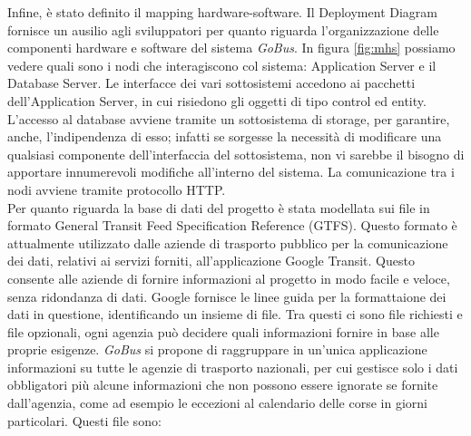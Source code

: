 Infine, \`{e} stato definito il mapping hardware-software. Il Deployment Diagram fornisce un ausilio agli sviluppatori per quanto riguarda l\rq organizzazione delle componenti hardware e software del sistema \emph{GoBus}. In figura \ref{fig:mhs} possiamo vedere quali sono i nodi che interagiscono col sistema: Application Server e il Database Server. Le interfacce dei vari sottosistemi accedono ai pacchetti dell\rq Application Server, in cui risiedono gli oggetti di tipo control ed entity. L\rq accesso al database avviene tramite un sottosistema di storage, per garantire, anche, l’indipendenza di esso; infatti se sorgesse la necessit\`{a} di modificare una qualsiasi componente dell’interfaccia del sottosistema, non vi sarebbe il bisogno di apportare innumerevoli modifiche all’interno del sistema. La comunicazione tra i nodi avviene tramite protocollo HTTP.\\
Per quanto riguarda la base di dati del progetto \`{e} stata modellata sui file in formato General Transit Feed Specification Reference (GTFS). Questo formato \`{e} attualmente utilizzato dalle aziende di trasporto pubblico per la comunicazione dei dati, 
relativi ai servizi forniti, all\rq applicazione Google Transit. Questo consente alle aziende di 
fornire informazioni al progetto in modo facile e veloce, senza ridondanza di dati. 
Google fornisce le linee guida per la formattaione dei dati in questione, identificando un 
insieme di file. Tra questi ci sono file richiesti e file opzionali, ogni agenzia può decidere 
quali informazioni fornire in base alle proprie esigenze. \emph{GoBus} si propone di raggruppare 
in un\rq unica applicazione informazioni su tutte le agenzie di trasporto nazionali, per cui 
gestisce solo i dati obbligatori più alcune informazioni che non possono essere ignorate 
se fornite dall\rq agenzia, come ad esempio le eccezioni al calendario delle corse in giorni 
particolari. Questi file sono:\\

